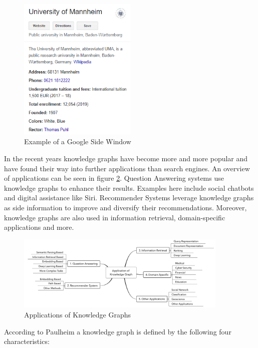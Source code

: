 \begin{figure}[H]
\centering
\includegraphics[width=0.5\textwidth]{images/example_google_side_window.png}
\caption{Example of a Google Side Window}
\label{fig:side_window_google}
\end{figure}

In the recent years knowledge graphs have become more and more popular and have found their way into further applications than search engines. An overview of applications can be seen in figure \ref{fig:application_kg}.   Question Answering systems use knowledge graphs to enhance their results. Examples here include social chatbots and digital assistance like Siri. Recommender Systems leverage knowledge graphs as side information to improve and diversify their recommendations.  Moreover, knowledge graphs are also used in information retrieval, domain-specific applications and more. \cite{zou_survey_2020}

\begin{figure}[H]
\centering
\includegraphics[width=0.9\textwidth]{images/applications_kg.png}
\caption{Applications of Knowledge Graphs}
\label{fig:application_kg}
\end{figure}

According to Paulheim \cite{paulheim_knowledge_2016} a knowledge graph is defined by the following four characteristics: 

